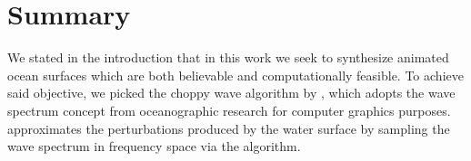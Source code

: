 \chapter{Summary}
\label{ch:summary}
%
%
We stated in the introduction that in this work we seek to synthesize
animated ocean surfaces which are both believable and computationally feasible.
%
To achieve said objective, we picked the choppy wave algorithm by \citet{course:simulatingocean},
which adopts the wave spectrum concept from oceanographic research for
computer graphics purposes.
\citeauthor{course:simulatingocean} approximates the
perturbations produced by the water surface by sampling the wave
spectrum in frequency space via the \FastFourierTransform algorithm.
%
%
